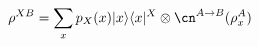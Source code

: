 \begin{equation}
	\rho^{XB} = \sum_x p_X(x) |x\rangle \langle x|^X \otimes \cn^{A \to B} (\rho_x^A)
\end{equation}